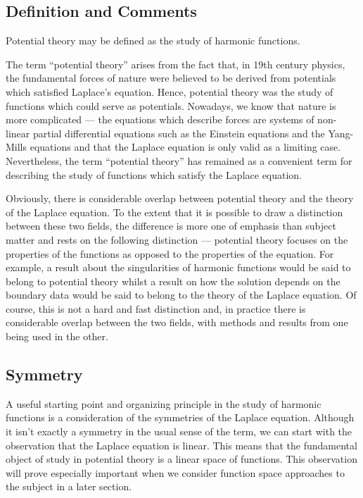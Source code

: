 \documentclass[12pt]{article}
\begin{document}
\subsection{Definition and Comments}

Potential theory may be defined as the study of harmonic functions.

The term ``potential theory'' arises from the fact that, in 19th century physics, the fundamental forces of nature were believed to be derived from potentials which satisfied Laplace's equation.  Hence, potential theory was the study of functions which could serve as potentials.  Nowadays, we know that nature is more complicated --- the equations which describe forces are systems of non-linear partial differential equations such as the Einstein equations and the Yang-Mills equations and that the Laplace equation is only valid as a limiting case.  Nevertheless, the term ``potential theory'' has remained as a convenient term for describing the study of functions which satisfy the Laplace equation.

Obviously, there is considerable overlap between potential theory and the theory of the Laplace equation.  To the extent that it is possible to draw a distinction between these two fields, the difference is more one of emphasis than subject matter and rests on the following distinction --- potential theory focuses on the properties of the functions as opposed to the properties of the equation.  For example, a result about the singularities of harmonic functions would be said to belong to potential theory whilst a result on how the solution depends on the boundary data would be said to belong to the theory of the Laplace equation.  Of course, this is not a hard and fast distinction and, in practice there is considerable overlap between the two fields, with methods and results from one being used in the other.

\subsection{Symmetry}

A useful starting point and organizing principle in the study of harmonic functions is a consideration of the symmetries of the Laplace equation.  Although it isn't exactly a symmetry in the usual sense of the term, we can start with the observation that the Laplace equation is linear.  This means that the fundamental object of study in potential theory is a linear space of functions.  This observation will prove especially important when we consider function space approaches to the subject in a later section.
\end{document}
